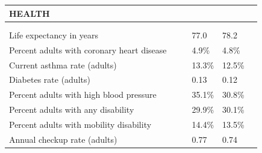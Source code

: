 \documentclass[9pt]{report}
\begin{document}
\newpage
\setlength{\tabcolsep}{.01in} %
\begin{tabular}{p{.10in}p{.10in}p{.10in}p{3.7in}>{\hfill}p{.85in}>{\hfill}p{.85in}>{\hfill}p{.85in}>{\hfill}p{.85in}p{0.1in}}
\multicolumn{9}{l}{\parbox{7.1in}{\raggedright{\large{\strut\textbf{HEALTH}\strut}}}} \\ 
\hline
\multicolumn{4}{l}{\parbox{3.5in}{\raggedright{\textbf{}}}} & \multicolumn{1}{r}{\parbox{.85in}{\strut\raggedleft{\textbf{}\strut}}} & \multicolumn{1}{r}{\parbox{.85in}{\strut\raggedleft{\textbf{}\strut}}} & \multicolumn{1}{r}{\parbox{.85in}{\strut{}}} & \multicolumn{1}{r}{\parbox{.85in}{\strut{}}} & \\ 
\multicolumn{9}{l}{} \\ 
\multicolumn{4}{l}{\parbox{3.6in}{\strut\raggedright{{Life expectancy in years}}\strut}} &  &  & 77.0 & 78.2 & \multicolumn{1}{l}{}  \\ 
\multicolumn{4}{l}{\parbox{3.6in}{\strut\raggedright{{Percent adults with coronary heart disease}}\strut}} &  &  & 4.9\% & 4.8\% & \multicolumn{1}{l}{}  \\ 
\multicolumn{4}{l}{\parbox{3.6in}{\strut\raggedright{{Current asthma rate (adults)}}\strut}} &  &  & 13.3\% & 12.5\% & \multicolumn{1}{l}{}  \\ 
\multicolumn{4}{l}{\parbox{3.6in}{\strut\raggedright{{Diabetes rate (adults)}}\strut}} &  &  & 0.13 & 0.12 & \multicolumn{1}{l}{}  \\ 
\multicolumn{4}{l}{\parbox{3.6in}{\strut\raggedright{{Percent adults with high blood pressure}}\strut}} &  &  & 35.1\% & 30.8\% & \multicolumn{1}{l}{}  \\ 
\multicolumn{4}{l}{\parbox{3.6in}{\strut\raggedright{{Percent adults with any disability}}\strut}} &  &  & 29.9\% & 30.1\% & \multicolumn{1}{l}{}  \\ 
\multicolumn{4}{l}{\parbox{3.6in}{\strut\raggedright{{Percent adults with mobility disability}}\strut}} &  &  & 14.4\% & 13.5\% & \multicolumn{1}{l}{}  \\ 
\multicolumn{4}{l}{\parbox{3.6in}{\strut\raggedright{{Annual checkup rate (adults)}}\strut}} &  &  & 0.77 & 0.74 & \multicolumn{1}{l}{}  \\ 

\end{tabular}
\end{document}
